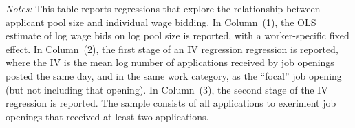 
\begin{table}[htbp!] \centering 
  \caption{Effects of applicant pool size on individual wage bidding behavior} 
  \label{tab:condition_on_pool_size} 
\begin{minipage}{1.0\textwidth} 
 \emph{Notes:} This table reports regressions that explore the relationship between applicant pool size and individual wage bidding.
In Column~(1), the OLS estimate of log wage bids on log pool size is reported, with a worker-specific fixed effect.
In Column~(2), the first stage of an IV regression regression is reported, where the IV is the mean log number of applications received by job openings posted the same day, and in the same work category, as the ``focal'' job opening (but not including that opening).
In Column~(3), the second stage of the IV regression is reported.
The sample consists of all applications to exeriment job openings that received at least two applications. 
 \starlanguage
 \end{minipage}
\end{table}
